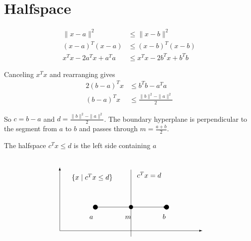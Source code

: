 \section{Halfspace}

\begin{align*}
    \|x-a\|^2 &\leq \|x-b\|^2 \\
    (x-a)^T(x-a) &\leq (x-b)^T(x-b) \\
    x^T x - 2a^T x + a^T a
        &\leq x^T x - 2b^T x + b^T b
\end{align*}

Canceling \(x^T x\) and rearranging gives
\begin{align*}
    2(b-a)^T x &\leq b^T b - a^T a \\
    (b-a)^T x &\leq \frac{\|b\|^2-\|a\|^2}{2}
\end{align*}

So $c = b-a$ and $d = \frac{\|b\|^2-\|a\|^2}{2}$.
The boundary hyperplane is perpendicular to the segment from \(a\) to \(b\) and passes through $m = \frac{a+b}{2}$.

The halfspace \(c^T x \leq d\) is the left side containing \(a\)

\[
\setlength{\unitlength}{1mm}
\begin{picture}(90,45)
    \put(10,8){\vector(1,0){72}}
    \put(10,8){\vector(0,1){32}}

    \put(28,20){\circle*{2.4}}
    \put(25,14){\(a\)}

    \put(64,20){\circle*{2.4}}
    \put(62,14){\(b\)}

    \put(46,20){\circle*{2.0}}
    \put(43,14){\(m\)}

    \put(46,5){\line(0,1){34}}
    \put(49,35){\(c^T x=d\)}

    \put(28,20){\vector(1,0){36}}

    \put(16,34){\(\{x\mid c^T x\le d\}\)}
\end{picture}
\]
